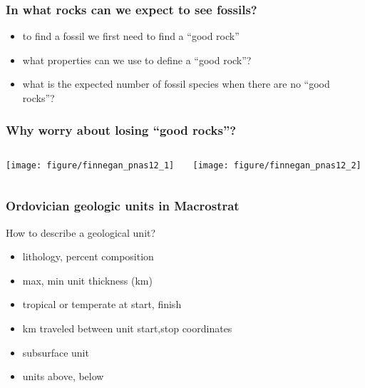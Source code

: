 \documentclass{beamer}
\begin{document}
\begin{frame}
  \frametitle{In what rocks can we expect to see fossils?}
  \begin{itemize}
    \item \alert{to find a fossil we first need to find a ``good rock''}
    \item what properties can we use to define a ``good rock''?
    \item what is the expected number of fossil species when there are no ``good rocks''?
  \end{itemize}
\end{frame}

\begin{frame}
  \frametitle{Why worry about losing ``good rocks''?}
  \begin{columns}
    \begin{column}{0.5\textwidth}
      \begin{center}
        \texttt{[image: figure/finnegan\_pnas12\_1]}
      \end{center}
    \end{column}
    \begin{column}{0.5\textwidth}
      \begin{center}
        \texttt{[image: figure/finnegan\_pnas12\_2]}
      \end{center}
    \end{column}
  \end{columns}
    
  \tiny{}
\end{frame}

\begin{frame}
  \frametitle{Ordovician geologic units in Macrostrat}

  \begin{block}{How to describe a geological unit?}
    \begin{itemize}
      \item lithology, percent composition
      \item max, min unit thickness (km)
      \item tropical or temperate at start, finish
      \item km traveled between unit start,stop coordinates
      \item subsurface unit
      \item units above, below
    \end{itemize}
  \end{block}
\end{frame}
\end{document}
